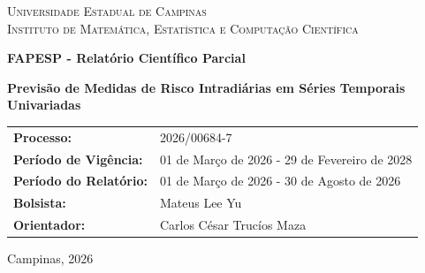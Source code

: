 \documentclass{article}
\title{}
\author{}
\date{}
\begin{document}
\begin{titlepage}
    \centering

    \textsc{Universidade Estadual de Campinas}\\
    \textsc{Instituto de Matemática, Estatística e Computação Científica}

    \vfill

    \textbf{FAPESP - Relatório Científico Parcial}

    \vspace{4em}

    \textbf{\Large Previsão de Medidas de Risco Intradiárias em Séries Temporais Univariadas}

    \vspace{4em}

    \begin{tabular}{ll}
        \textbf{Processo:} & 2026/00684-7\\
        \textbf{Período de Vigência:}  & 01 de Março de 2026 - 29 de Fevereiro de 2028\\
        \textbf{Período do Relatório:} & 01 de Março de 2026 - 30 de Agosto de 2026\\
        \textbf{Bolsista:} & Mateus Lee Yu\\
        \textbf{Orientador:} & Carlos César Trucíos Maza
    \end{tabular}

    \vfill

    Campinas, 2026
\end{titlepage}
\newpage
\end{document}
